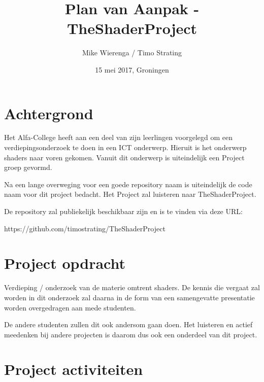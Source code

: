 \documentclass[]{report}
\title{Plan van Aanpak - TheShaderProject}
\author{Mike Wierenga / Timo Strating}
\date{15 mei 2017, Groningen}
\begin{document}
\maketitle

\tableofcontents
\newpage






\chapter{Achtergrond}

Het Alfa-College heeft aan een deel van zijn leerlingen voorgelegd om een verdiepingsonderzoek te doen in een ICT onderwerp. Hieruit is het onderwerp shaders naar voren gekomen. Vanuit dit onderwerp is uiteindelijk een Project groep gevormd. 

Na een lange overweging voor een goede repository naam is uiteindelijk de code naam voor dit project bedacht. Het Project zal luisteren naar TheShaderProject.

De repository zal publiekelijk beschikbaar zijn en is te vinden via deze URL:
\begin{center}
	https://github.com/timostrating/TheShaderProject
\end{center}



\chapter{Project opdracht}

Verdieping / onderzoek van de materie omtrent shaders. De kennis die vergaat zal worden in dit onderzoek zal daarna in de form van een samengevatte presentatie worden overgedragen aan mede studenten. 

De andere studenten zullen dit ook andersom gaan doen. Het luisteren en actief meedenken bij andere projecten is daarom dus ook een onderdeel van dit project.




\chapter{Project activiteiten}
\end{document}
